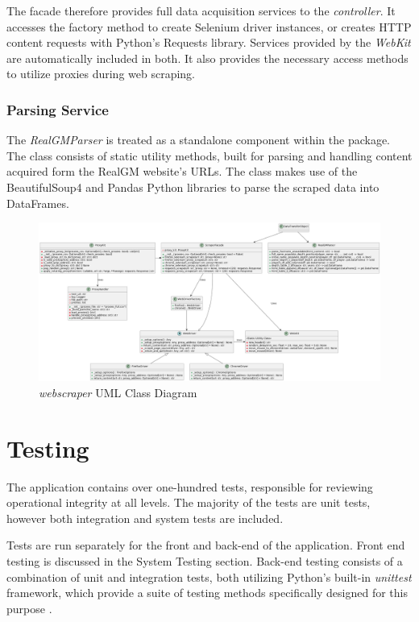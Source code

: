 \documentclass{thesis-ekf}
\theoremstyle{definition}
\theoremstyle{remark}
\begin{document}
The facade therefore provides full data acquisition services to the \emph{controller}. It accesses the factory method to create Selenium driver instances, or creates HTTP content requests with Python's Requests library. Services provided by the \emph{WebKit} are automatically included in both. It also provides the necessary access methods to utilize proxies during web scraping.

\subsection{Parsing Service}
The \emph{RealGMParser} is treated as a standalone component within the package. The class consists of static utility methods, built for parsing and handling content acquired form the RealGM website's URLs. The class makes use of the BeautifulSoup4 and Pandas Python libraries to parse the scraped data into DataFrames.

\begin{figure}[th!]
	\centering
	\includegraphics[width=1\linewidth]{img/class/webscraper}
	\caption{\emph{webscraper} UML Class Diagram}
	\label{img-webscraper-class}
\end{figure}


\chapter{Testing} \label{ch-testing}
The application contains over one-hundred tests, responsible for reviewing operational integrity at all levels. The majority of the tests are unit tests, however both integration and system tests are included. 

Tests are run separately for the front and back-end of the application. Front end testing is discussed in the System Testing section. Back-end testing consists of a combination of unit and integration tests, both utilizing Python's built-in \emph{unittest} framework, which provide a suite of testing methods specifically designed for this purpose \cite{unittest}.
\end{document}
